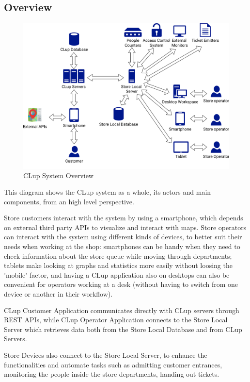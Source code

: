 \subsection{Overview}
\begin{figure}[H]
    \centering
    \includegraphics[scale=0.6]{Images/overview.pdf}
    \caption{\label{fig:Overview} CLup System Overview}
\end{figure}

This diagram shows the CLup system as a whole, its actors and main components, from an high level perspective. 

Store customers interact with the system by using a smartphone, which depends on external third party APIs to visualize and interact with maps.
Store operators can interact with the system using different kinds of devices, to better suit their needs when working at the shop: smartphones can be handy when they need to check information about the store queue while moving through departments; tablets make looking at graphs and statistics more easily without loosing the 'mobile' factor, and having a CLup application also on desktops can also be convenient for operators working at a desk (without having to switch from one device or another in their workflow).

CLup Customer Application communicates directly with CLup servers through REST APIs, while CLup Operator Application connects to the Store Local Server which retrieves data both from the Store Local Database and from CLup Servers. 

Store Devices also connect to the Store Local Server, to enhance the functionalities and automate tasks such as admitting customer entrances, monitoring the people inside the store departments, handing out tickets.

